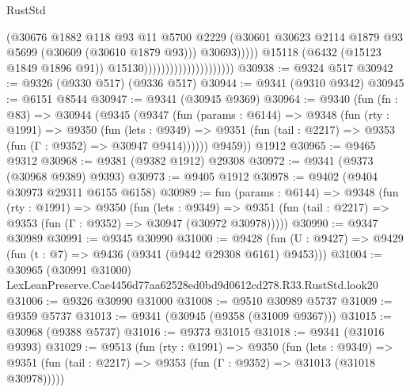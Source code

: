 \begin{lexlean}{RustStd}
\begin{coremodule}
                                                      (@30676
                                                        @1882
                                                        @118
                                                        @93
                                                        @11
                                                        @5700
                                                        @2229
                                                        (@30601
                                                          @30623
                                                          @2114
                                                          @1879
                                                          @93
                                                          @5699
                                                          (@30609 (@30610 @1879 @93)))
                                                        @30693)))))
                                              @15118
                                              (@6432 (@15123 @1849 @1896 @91))
                                              @15130)))))))))))))))))))))
@30938 := @9324 @517
@30942 := @9326 (@9330 @517) (@9336 @517)
@30944 := @9341 (@9310 @9342)
@30945 := @6151 @8544
@30947 := @9341 (@30945 @9369)
@30964 := @9340
    (fun (fn : @83) =>
    @30944
      (@9345
        (@9347
          (fun (params : @6144) =>
          @9348
            (fun (rty : @1991) =>
            @9350
              (fun (lets : @9349) =>
              @9351 (fun (tail : @2217) => @9353 (fun (Γ : @9352) => @30947 @9414))))))
        @9459))
    @1912
@30965 := @9465 @9312
@30968 := @9381 (@9382 @1912) @29308
@30972 := @9341 (@9373 (@30968 @9389) @9393)
@30973 := @9405 @1912
@30978 := @9402 (@9404 @30973 @29311 @6155 @6158)
@30989 := fun (params : @6144) =>
  @9348
    (fun (rty : @1991) =>
    @9350
      (fun (lets : @9349) =>
      @9351 (fun (tail : @2217) => @9353 (fun (Γ : @9352) => @30947 (@30972 @30978)))))
@30990 := @9347 @30989
@30991 := @9345 @30990
@31000 := @9428
    (fun (U : @9427) => @9429 (fun (t : @7) => @9436 (@9341 (@9442 @29308 @6161) @9453)))
@31004 := @30965
    (@30991 @31000)
    LexLeanPreserve.Cae4456d77aa62528ed0bd9d0612cd278.R33.RustStd.look20
@31006 := @9326 @30990 @31000
@31008 := @9510 @30989 @5737
@31009 := @9359 @5737
@31013 := @9341 (@30945 (@9358 (@31009 @9367)))
@31015 := @30968 (@9388 @5737)
@31016 := @9373 @31015
@31018 := @9341 (@31016 @9393)
@31029 := @9513
    (fun (rty : @1991) =>
    @9350
      (fun (lets : @9349) =>
      @9351 (fun (tail : @2217) => @9353 (fun (Γ : @9352) => @31013 (@31018 @30978)))))

\end{coremodule}
\end{lexlean}
